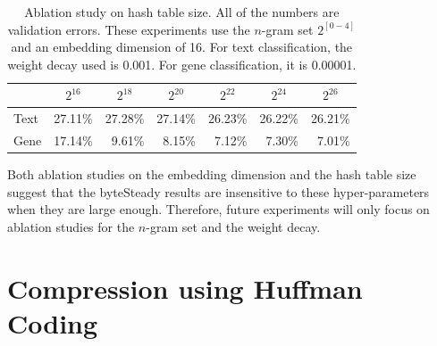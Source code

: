 \documentclass[sigconf,review, anonymous]{acmart}
\begin{document}
\begin{table}[t]
  \caption{Ablation study on hash table size. All of the numbers are validation errors. These experiments use the \(n\)-gram set \(2^{[0-4]}\) and an embedding dimension of 16. For text classification, the weight decay used is 0.001. For gene classification, it is 0.00001.}
  \label{tab:hash}
  \begin{center}
    \begin{tabular}{lrrrrrr}
      \hline
      &
      \multicolumn{1}{c}{\(2^{16}\)} &
      \multicolumn{1}{c}{\(2^{18}\)} &
      \multicolumn{1}{c}{\(2^{20}\)} &
      \multicolumn{1}{c}{\(2^{22}\)} & \multicolumn{1}{c}{\(2^{24}\)} & \multicolumn{1}{c}{\(2^{26}\)} \\ \hline
      Text & 27.11\% & 27.28\% & 27.14\% & 26.23\% & 26.22\% & 26.21\% \\
      Gene & 17.14\% & 9.61\% & 8.15\% & 7.12\% & 7.30\% & 7.01\% \\
    \hline
    \end{tabular}
  \end{center}
\end{table}

Both ablation studies on the embedding dimension and the hash table size suggest that the byteSteady results are insensitive to these hyper-parameters when they are large enough. Therefore, future experiments will only focus on ablation studies for the \(n\)-gram set and the weight decay.

\section{Compression using Huffman Coding}
\end{document}
